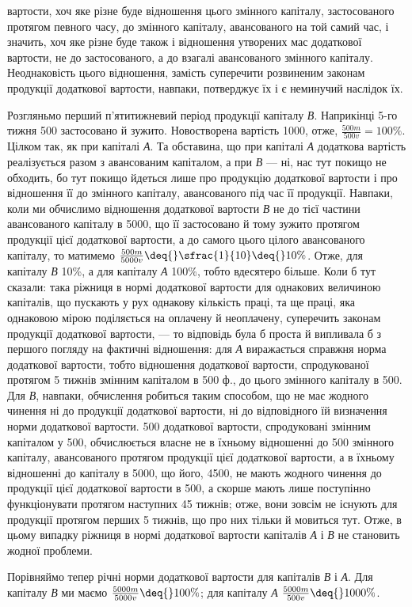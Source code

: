 \parcont{}  %
вартости, хоч яке різне буде відношення цього змінного капіталу, застосованого
протягом певного часу, до змінного капіталу, авансованого на
той самий час, і значить, хоч яке різне буде також і відношення утворених
мас додаткової вартости, не до застосованого, а до взагалі авансованого
змінного капіталу. Неоднаковість цього відношення, замість суперечити
розвиненим законам продукції додаткової вартости, навпаки,
потверджує їх і є неминучий наслідок їх.

Розгляньмо перший п’ятитижневий період продукції капіталу \emph{В}. Наприкінці
5-го тижня 500 застосовано й зужито. Новостворена
вартість \deq{} 1000, отже, $\frac{500m}{500v}=100\%$. Цілком так, як при капіталі \emph{А}.
Та обставина, що при капіталі \emph{А} додаткова вартість реалізується разом з
авансованим капіталом, а при \emph{В} — ні, нас тут покищо не обходить, бо
тут покищо йдеться лише про продукцію додаткової вартости і про
відношення її до змінного капіталу, авансованого під час її продукції.
Навпаки, коли ми обчислимо відношення додаткової вартости \emph{В} не
до тієї частини авансованого капіталу в 5000, що її застосовано й
тому зужито протягом продукції цієї додаткової вартости, а до самого
цього цілого авансованого капіталу, то матимемо $\frac{500m}{5000v} \deq{} \sfrac{1}{10} \deq{} 10\%$.
Отже, для капіталу \emph{В} 10\%, а для капіталу \emph{А} 100\%, тобто вдесятеро
більше. Коли б тут сказали: така ріжниця в нормі додаткової вартости
для однакових величиною капіталів, що пускають у рух однакову кількість
праці, та ще праці, яка однаковою мірою поділяється на оплачену й
неоплачену, суперечить законам продукції додаткової вартости, — то
відповідь була б проста й випливала б з першого погляду на фактичні
відношення: для \emph{А} виражається справжня норма додаткової вартости,
тобто відношення додаткової вартости, спродукованої протягом 5 тижнів
змінним капіталом в 500 ф., до цього змінного капіталу в 500.
Для \emph{В}, навпаки, обчислення робиться таким способом, що не має жодного
чинення ні до продукції додаткової вартости, ні до відповідного їй
визначення норми додаткової вартости. 500 додаткової вартости,
спродуковані змінним капіталом у 500, обчислюється
власне не в їхньому відношенні до 500 змінного капіталу, авансованого
протягом продукції цієї додаткової вартости, а в їхньому відношенні
до капіталу в 5000, що  його, 4500, не мають
жодного чинення до продукції цієї додаткової вартости в 500, а
скорше мають лише поступінно функціонувати протягом наступних 45 тижнів;
отже, вони зовсім не існують для продукції протягом перших 5 тижнів,
що про них тільки й мовиться тут. Отже, в цьому випадку ріжниця
в нормі додаткової вартости капіталів \emph{А} і \emph{В} не становить жодної
проблеми.

Порівняймо тепер річні норми додаткової вартости для капіталів \emph{В} і \emph{А}.
Для капіталу \emph{В} ми маємо $\frac{5000m}{5000v} \deq{} 100\%$;
для капіталу \emph{А} $\frac{5000m}{500v} \deq{} 1000\%$.
\parbreak{}  %
